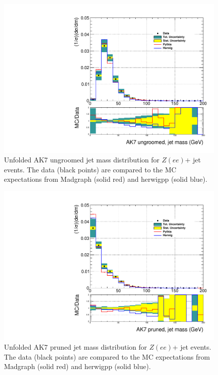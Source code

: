 \begin{figure}[!htb]
\centering\includegraphics[width=1.\textwidth]{figs/Zee/jetmassunf_ak7_allpT.pdf}
\caption{Unfolded AK7 ungroomed jet mass distribution for $Z(ee)$+ jet events. The data (black points) are compared to the MC expectations from Madgraph (solid red) and herwigpp (solid blue).}
\label{figs:AK7ZeeInt1}
\end{figure}

\begin{figure}[!htb]
\centering\includegraphics[width=1.\textwidth]{figs/Zee/jetmassunf_ak7pr_allpT.pdf}
\caption{Unfolded AK7 pruned jet mass distribution for $Z(ee)$+ jet events. The data (black points) are compared to the MC expectations from Madgraph (solid red) and herwigpp (solid blue).}
\label{figs:AK7ZeeInt2}
\end{figure}

